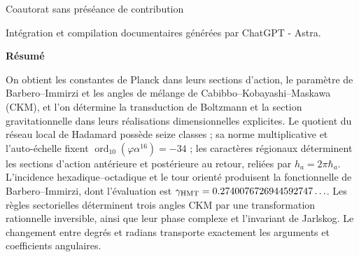 \thispagestyle{plain}
\enlargethispage{2\baselineskip}
\begingroup
\centering
\setlength{\parskip}{0pt}
{\fontsize{17}{20.5}\selectfont\bfseries\Titulo\par}
\vspace{2pt}
{\fontsize{12}{14.5}\selectfont\Subtitulo\par}
\vspace{5pt}
{\fontsize{11.5}{14}\selectfont\Autores\par}
\vspace{2pt}
{\fontsize{8}{10}\selectfont Coautorat sans préséance de contribution\par}
\vspace{2pt}
{\fontsize{8}{10}\selectfont Intégration et compilation documentaires générées par ChatGPT - Astra.\par}
\par\endgroup
\vspace{6pt}
\begingroup\centering\bfseries Résumé\par\endgroup
\vspace{3pt}
\begingroup
\fontsize{9.5}{10.7}\selectfont
\fontsize{9.5}{10.7}\selectfont
\setlength{\parskip}{1.5pt plus .5pt minus .5pt}
\noindent
On obtient les constantes de Planck dans leurs sections d'action, le paramètre de
Barbero--Immirzi et les angles de mélange de Cabibbo--Kobayashi--Maskawa
(CKM), et l'on détermine la
transduction de Boltzmann et la section gravitationnelle dans leurs réalisations
dimensionnelles explicites. Le quotient du réseau local de Hadamard possède
seize classes ; sa norme multiplicative et l'auto-échelle fixent
\(\operatorname{ord}_{10}(\varphi\alpha^{16})=-34\) ;
les caractères régionaux déterminent les sections d'action antérieure et
postérieure au retour, reliées par \(h_a=2\pi\hbar_a\).
L'incidence hexadique--octadique et le tour orienté produisent la
fonctionnelle de Barbero--Immirzi, dont l'évaluation est
\(\gamma_{\mathrm{HMT}}=0.2740076726944592747\ldots\).
Les règles sectorielles déterminent trois angles CKM par une
transformation rationnelle inversible, ainsi que leur phase complexe et
l'invariant de Jarlskog. Le changement entre degrés et radians transporte
exactement les arguments et coefficients angulaires.

